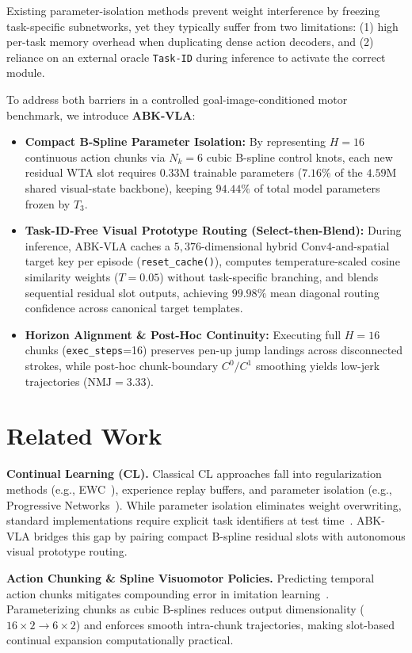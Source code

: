 \documentclass[10pt,twocolumn]{article}
\begin{document}
Existing parameter-isolation methods prevent weight interference by freezing task-specific subnetworks, yet they typically suffer from two limitations: (1) high per-task memory overhead when duplicating dense action decoders, and (2) reliance on an external oracle \texttt{Task-ID} during inference to activate the correct module.

To address both barriers in a controlled goal-image-conditioned motor benchmark, we introduce \textbf{ABK-VLA}:
\begin{itemize}
    \item \textbf{Compact B-Spline Parameter Isolation:} By representing $H=16$ continuous action chunks via $N_k=6$ cubic B-spline control knots, each new residual WTA slot requires $0.33\text{M}$ trainable parameters ($7.16\%$ of the $4.59\text{M}$ shared visual-state backbone), keeping $94.44\%$ of total model parameters frozen by $T_3$.
    \item \textbf{Task-ID-Free Visual Prototype Routing (Select-then-Blend):} During inference, ABK-VLA caches a $5{,}376$-dimensional hybrid Conv4-and-spatial target key per episode (\texttt{reset\_cache()}), computes temperature-scaled cosine similarity weights ($T=0.05$) without task-specific branching, and blends sequential residual slot outputs, achieving $99.98\%$ mean diagonal routing confidence across canonical target templates.
    \item \textbf{Horizon Alignment \& Post-Hoc Continuity:} Executing full $H=16$ chunks (\texttt{exec\_steps}=16) preserves pen-up jump landings across disconnected strokes, while post-hoc chunk-boundary $C^0/C^1$ smoothing yields low-jerk trajectories ($\mathrm{NMJ}=3.33$).
\end{itemize}

\section{Related Work}
\textbf{Continual Learning (CL).} Classical CL approaches fall into regularization methods (e.g., EWC~\cite{kirkpatrick2017}), experience replay buffers, and parameter isolation (e.g., Progressive Networks~\cite{rusu2016}). While parameter isolation eliminates weight overwriting, standard implementations require explicit task identifiers at test time~\cite{farquhar2018}. ABK-VLA bridges this gap by pairing compact B-spline residual slots with autonomous visual prototype routing.

\textbf{Action Chunking \& Spline Visuomotor Policies.} Predicting temporal action chunks mitigates compounding error in imitation learning~\cite{zhao2023}. Parameterizing chunks as cubic B-splines reduces output dimensionality ($16\times 2 \rightarrow 6\times 2$) and enforces smooth intra-chunk trajectories, making slot-based continual expansion computationally practical.
\end{document}
